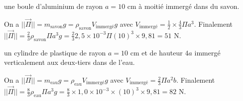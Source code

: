 
\begin{enonce}
une boule d'aluminium de rayon $a=10$ cm à moitié immergé dans du savon.
\end{enonce}


\begin{corrige}
On a $|| \overrightarrow{\Pi}||=m_\mathrm{savon} g = \rho_\mathrm{savon} V_\mathrm{immergé} g$ avec $V_\mathrm{immergé}= \frac{1}{2} \times \frac{4}{3}\Pi a^3$. Finalement $|| \overrightarrow{\Pi}||=\frac{2}{3} \rho_\mathrm{savon} \Pi a^3 g=\frac{2}{3} 2,5\times 10^{-3} \Pi (10)^3 \times 9,81=51$ N. 
\end{corrige}




\begin{enonce}
un cylindre de plastique de rayon $a=10$ cm et de hauteur $4a$ immergé verticalement aux deux-tiers dans de l'eau.
\end{enonce}


\begin{corrige}
On a $|| \overrightarrow{\Pi}||=m_\mathrm{eau} g = \rho_\mathrm{eau} V_\mathrm{immergé} g$ avec $V_\mathrm{immergé}= \frac{2}{3} \Pi a^2 b$. Finalement $|| \overrightarrow{\Pi}||= \frac{8}{3}\rho_\mathrm{eau} \Pi a^3 g= \frac{8}{3} \times 1,0\times 10^{-3} \times (10)^3 \times 9,81=82$ N.
\end{corrige}





\finEntrainement

\hauteurLargeurCadreReponse		{8mm}{2.5cm}
\initialisationEntrainement


